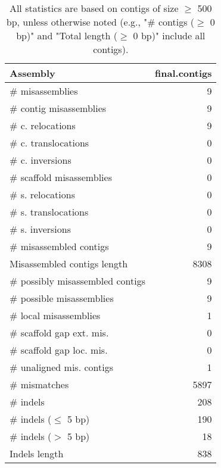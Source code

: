 \documentclass[12pt,a4paper]{article}
\begin{document}
\begin{table}[ht]
\begin{center}
\caption{All statistics are based on contigs of size $\geq$ 500 bp, unless otherwise noted (e.g., "\# contigs ($\geq$ 0 bp)" and "Total length ($\geq$ 0 bp)" include all contigs).}
\begin{tabular}{|l*{1}{|r}|}
\hline
Assembly & final.contigs \\ \hline
\# misassemblies & 9 \\ \hline
\hspace{2mm}\# contig misassemblies & 9 \\ \hline
\hspace{5mm}\# c. relocations & 9 \\ \hline
\hspace{5mm}\# c. translocations & 0 \\ \hline
\hspace{5mm}\# c. inversions & 0 \\ \hline
\hspace{2mm}\# scaffold misassemblies & 0 \\ \hline
\hspace{5mm}\# s. relocations & 0 \\ \hline
\hspace{5mm}\# s. translocations & 0 \\ \hline
\hspace{5mm}\# s. inversions & 0 \\ \hline
\# misassembled contigs & 9 \\ \hline
Misassembled contigs length & 8308 \\ \hline
\# possibly misassembled contigs & 9 \\ \hline
\hspace{5mm}\# possible misassemblies & 9 \\ \hline
\# local misassemblies & 1 \\ \hline
\# scaffold gap ext. mis. & 0 \\ \hline
\# scaffold gap loc. mis. & 0 \\ \hline
\# unaligned mis. contigs & 1 \\ \hline
\# mismatches & 5897 \\ \hline
\# indels & 208 \\ \hline
\hspace{5mm}\# indels ($\leq$ 5 bp) & 190 \\ \hline
\hspace{5mm}\# indels ($>$ 5 bp) & 18 \\ \hline
Indels length & 838 \\ \hline
\end{tabular}
\end{center}
\end{table}
\end{document}
